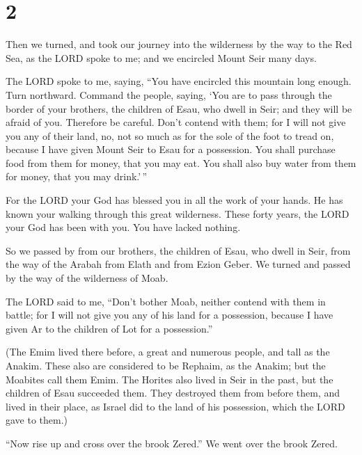 \hypertarget{section-1}{%
\section{2}\label{section-1}}

 Then we turned, and took our journey into the wilderness by
the way to the Red Sea, as the LORD spoke to me; and we encircled Mount
Seir many days.

 The LORD spoke to me, saying,  ``You have
encircled this mountain long enough. Turn northward. 
Command the people, saying, `You are to pass through the border of your
brothers, the children of Esau, who dwell in Seir; and they will be
afraid of you. Therefore be careful.  Don't contend with
them; for I will not give you any of their land, no, not so much as for
the sole of the foot to tread on, because I have given Mount Seir to
Esau for a possession.  You shall purchase food from them
for money, that you may eat. You shall also buy water from them for
money, that you may drink.'\,''

 For the LORD your God has blessed you in all the work of
your hands. He has known your walking through this great wilderness.
These forty years, the LORD your God has been with you. You have lacked
nothing.

 So we passed by from our brothers, the children of Esau,
who dwell in Seir, from the way of the Arabah from Elath and from Ezion
Geber. We turned and passed by the way of the wilderness of Moab.

 The LORD said to me, ``Don't bother Moab, neither contend
with them in battle; for I will not give you any of his land for a
possession, because I have given Ar to the children of Lot for a
possession.''

 (The Emim lived there before, a great and numerous people,
and tall as the Anakim.  These also are considered to be
Rephaim, as the Anakim; but the Moabites call them Emim. 
The Horites also lived in Seir in the past, but the children of Esau
succeeded them. They destroyed them from before them, and lived in their
place, as Israel did to the land of his possession, which the LORD gave
to them.)

 ``Now rise up and cross over the brook Zered.'' We went
over the brook Zered.

